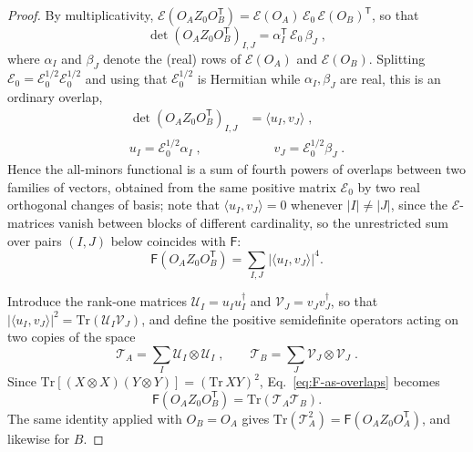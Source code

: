 \documentclass[aps,prl,twocolumn,superscriptaddress,reprint,longbibliography,nofootinbib]{revtex4-2}
\newcommand{\trans}{\mathsf{T}}
\begin{document}
\begin{proof}
By multiplicativity, $\mathcal{E}(O_AZ_0O_B^{\trans})=\mathcal{E}(O_A)\,\mathcal{E}_0\,\mathcal{E}(O_B)^{\trans}$, so that
\begin{equation}
    \det\!\left(O_AZ_0O_B^{\trans}\right)_{I,J}=\alpha_I^{\trans}\,\mathcal{E}_0\,\beta_J\;,
\end{equation}
where $\alpha_I$ and $\beta_J$ denote the (real) rows of $\mathcal{E}(O_A)$ and $\mathcal{E}(O_B)$. Splitting $\mathcal{E}_0=\mathcal{E}_0^{1/2}\mathcal{E}_0^{1/2}$ and using that $\mathcal{E}_0^{1/2}$ is Hermitian while $\alpha_I,\beta_J$ are real, this is an ordinary overlap,
\begin{equation}
\begin{split}
    \det\!\left(O_AZ_0O_B^{\trans}\right)_{I,J}&=\langle u_I,v_J\rangle\;,\\
    u_I=\mathcal{E}_0^{1/2}\alpha_I\;,&\qquad v_J=\mathcal{E}_0^{1/2}\beta_J\;.
\end{split}
    \label{eq:minors-as-overlaps}
\end{equation} 
Hence the all-minors functional is a sum of fourth powers of overlaps between two families of vectors, obtained from the same positive matrix $\mathcal{E}_0$ by two real orthogonal changes of basis; note that $\langle u_I,v_J\rangle=0$ whenever $|I|\neq|J|$, since the $\mathcal{E}$-matrices vanish between blocks of different cardinality, so the unrestricted sum over pairs $(I,J)$ below coincides with $\mathsf{F}$:
\begin{equation}
    \mathsf{F}\!\left(O_AZ_0O_B^{\trans}\right)=\sum_{I,J}\left|\langle u_I,v_J\rangle\right|^4 .
    \label{eq:F-as-overlaps}
\end{equation}


Introduce the rank-one matrices $\mathcal{U}_I=u_Iu_I^\dagger$ and $\mathcal{V}_J=v_Jv_J^\dagger$, so that $|\langle u_I,v_J\rangle|^2=\mathrm{Tr}(\mathcal{U}_I\mathcal{V}_J)$, and define the positive semidefinite operators acting on two copies of the space
\begin{equation}
    \mathcal{T}_A=\sum_I \mathcal{U}_I\otimes \mathcal{U}_I\;,\qquad
    \mathcal{T}_B=\sum_J \mathcal{V}_J\otimes \mathcal{V}_J\;.
\end{equation} 
Since $\mathrm{Tr}\!\left[(X\otimes X)(Y\otimes Y)\right]=\left(\mathrm{Tr}\,XY\right)^2$, Eq.~\eqref{eq:F-as-overlaps} becomes
\begin{equation}
    \mathsf{F}\!\left(O_AZ_0O_B^{\trans}\right)=\mathrm{Tr}\!\left(\mathcal{T}_A\mathcal{T}_B\right).
    \label{eq:F-as-trace}
\end{equation}
The same identity applied with $O_B=O_A$ gives $\mathrm{Tr}(\mathcal{T}_A^2)=\mathsf{F}(O_AZ_0O_A^{\trans})$, and likewise for $B$.


\end{proof}
\end{document}
